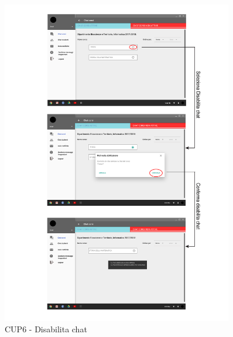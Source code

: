 \begin{figure}
	\centering
	\includegraphics[width=0.9\textwidth]{imgs/gruppo6/activities/act_cup6_disabilita_chat.pdf}
	\caption{CUP6 - Disabilita chat}
	\label{fig:cup6}
\end{figure}


